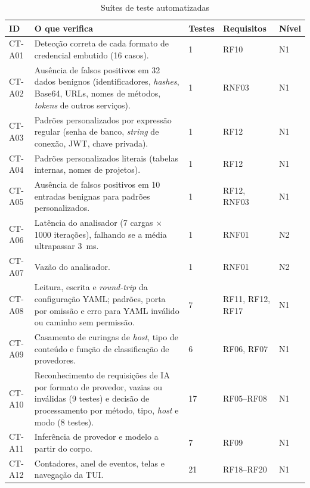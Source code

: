 \begin{table}[htb]
\centering
\caption{Suítes de teste automatizadas}\label{tab:suites}
\small
\begin{tabular}{|p{1.3cm}|p{5.9cm}|p{1.6cm}|p{2.2cm}|p{2.4cm}|}
\hline
\textbf{ID} & \textbf{O que verifica} & \textbf{Testes} & \textbf{Requisitos} & \textbf{Nível} \\ \hline
CT-A01 & Detecção correta de cada formato de credencial embutido (16 casos). & 1 & RF10 & N1 \\ \hline
CT-A02 & Ausência de falsos positivos em 32 dados benignos (identificadores, \textit{hashes}, Base64, URLs, nomes de métodos, \textit{tokens} de outros serviços). & 1 & RNF03 & N1 \\ \hline
CT-A03 & Padrões personalizados por expressão regular (senha de banco, \textit{string} de conexão, JWT, chave privada). & 1 & RF12 & N1 \\ \hline
CT-A04 & Padrões personalizados literais (tabelas internas, nomes de projetos). & 1 & RF12 & N1 \\ \hline
CT-A05 & Ausência de falsos positivos em 10 entradas benignas para padrões personalizados. & 1 & RF12, RNF03 & N1 \\ \hline
CT-A06 & Latência do analisador (7 cargas $\times$ 1000 iterações), falhando se a média ultrapassar 3~ms. & 1 & RNF01 & N2 \\ \hline
CT-A07 & Vazão do analisador. & 1 & RNF01 & N2 \\ \hline
CT-A08 & Leitura, escrita e \textit{round-trip} da configuração YAML; padrões, porta por omissão e erro para YAML inválido ou caminho sem permissão. & 7 & RF11, RF12, RF17 & N1 \\ \hline
CT-A09 & Casamento de curingas de \textit{host}, tipo de conteúdo e função de classificação de provedores. & 6 & RF06, RF07 & N1 \\ \hline
CT-A10 & Reconhecimento de requisições de IA por formato de provedor, vazias ou inválidas (9 testes) e decisão de processamento por método, tipo, \textit{host} e modo (8 testes). & 17 & RF05--RF08 & N1 \\ \hline
CT-A11 & Inferência de provedor e modelo a partir do corpo. & 7 & RF09 & N1 \\ \hline
CT-A12 & Contadores, anel de eventos, telas e navegação da TUI. & 21 & RF18--RF20 & N1 \\ \hline
\end{tabular}
\end{table}

